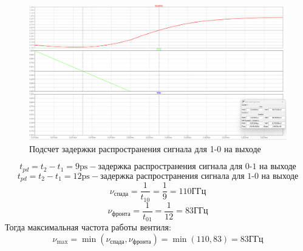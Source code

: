 \documentclass[12pt,onecolumn]{article}
\begin{document}
\begin{figure}[H]
    \centering
    \includegraphics[width=\textwidth]{image/rise.png}
    \caption{Подсчет задержки распространения сигнала для 1-0 на выходе}
\end{figure}
$$
    t_{pd} = t_2 - t_1 = 9 \text{ps} - \text{задержка распространения сигнала для 0-1 на выходе}
$$
$$
    t_{pd} = t_2 - t_1 = 12 \text{ps} - \text{задержка распространения сигнала для 1-0 на выходе}
$$
$$
    \nu_{\text{спада}} = \frac{1}{t_{10}} = \frac{1}{9} = 110 \text{ГГц}
$$
$$
    \nu_{\text{фронта}} = \frac{1}{t_{01}} = \frac{1}{12} = 83\text{ГГц}
$$
Тогда максимальная частота работы вентиля:
$$
\nu_{\max} = \min(\nu_{\text{спада}}, \nu_{\text{фронта}}) = \min(110, 83 ) = 83 \text{ГГц}
$$
\end{document}

